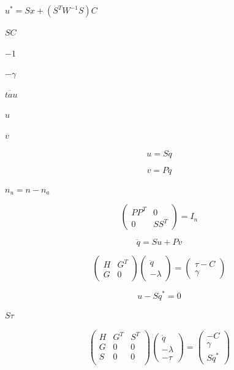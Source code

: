 \documentclass{article}
\begin{document}
$u^* = Sx + (S^T W^{-1} S)C$
\pagebreak

$SC$
\pagebreak

$-1$
\pagebreak

$-\gamma$
\pagebreak

$\ddot{tau}$
\pagebreak

$u$
\pagebreak

$v$
\pagebreak

\[
  u = S \ddot{q}
  \]
\pagebreak

\[
  v = P \ddot{q}
  \]
\pagebreak

$n_u=n-n_a$
\pagebreak

\[
    \left(\begin{array}{cc}
      PP^T & 0 \\
      0 & SS^T
    \end{array}\right) = I_{n}
  \]
\pagebreak

\[
    \ddot{q} = S u + P v
  \]
\pagebreak

\[ \left( \begin{array}{cc}
      H & G^T \\
      G & 0
    \end{array} \right)
    \left( \begin{array}{c}
    \ddot{q} \\
    -\lambda
    \end{array} \right)
    =\left(
    \begin{array}{c}
       \tau - C\\
       \gamma
    \end{array}
    \right)
\]
\pagebreak

\[
 u - S \ddot{q}^* = 0
\]
\pagebreak

$S \tau$
\pagebreak

\[ \left( \begin{array}{ccc}
      H & G^T  & S^T\\
      G & 0 & 0 \\
      S & 0 & 0 \\
    \end{array} \right)
    \left( \begin{array}{c}
    \ddot{q} \\
    -\lambda \\
    -\tau
    \end{array} \right)
    =\left(
    \begin{array}{c}
       - C\\
       \gamma \\
       S\ddot{q}^*
    \end{array}
    \right)
\]
\pagebreak
\end{document}
